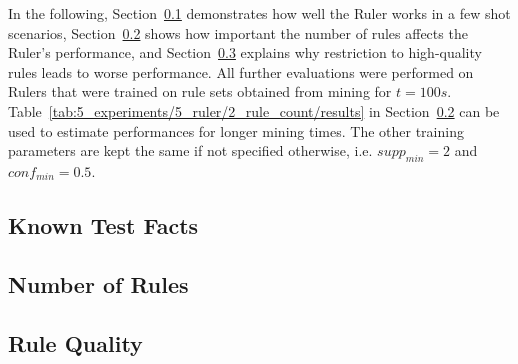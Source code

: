 In the following, Section~\ref{subsec:5_experiments/5_ruler/1_known} demonstrates how well the Ruler works in a few shot scenarios, Section~\ref{subsec:5_experiments/5_ruler/2_rule_count} shows how important the number of rules affects the Ruler's performance, and Section~\ref{subsec:5_experiments/5_ruler/3_rule_quality} explains why restriction to high-quality rules leads to worse performance. All further evaluations were performed on Rulers that were trained on rule sets obtained from mining for $t = 100s$. Table~\ref{tab:5_experiments/5_ruler/2_rule_count/results} in Section~\ref{subsec:5_experiments/5_ruler/2_rule_count} can be used to estimate performances for longer mining times. The other training parameters are kept the same if not specified otherwise, i.e. $supp_{min} = 2$ and $conf_{min} = 0.5$.

\subsection{Known Test Facts}
\label{subsec:5_experiments/5_ruler/1_known}


\subsection{Number of Rules}
\label{subsec:5_experiments/5_ruler/2_rule_count}


\subsection{Rule Quality}
\label{subsec:5_experiments/5_ruler/3_rule_quality}

